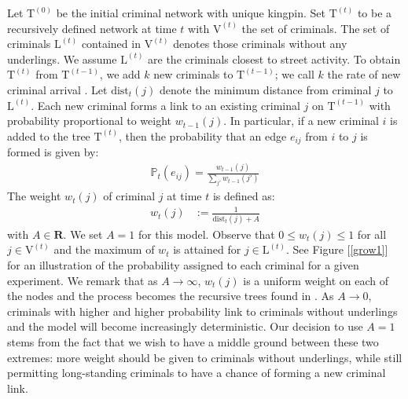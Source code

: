 \documentclass[%
 reprint,
 amsmath,amssymb,
 aps,
]{revtex4-1}
\newcommand{\dist}{\textrm{dist}}
\renewcommand{\b}[1]{\mathbf{#1}}
\renewcommand{\t }[1]{\mathrm{#1}}
\newcommand{\bb}[1]{\mathbb{#1}}
\renewcommand{\L}{\mathrm{L}}
\newcommand{\V}{\mathrm{V}}
\theoremstyle{plain}
\theoremstyle{definition}
\begin{document}
Let $\t T^{(0)}$ be the initial criminal network with unique kingpin.  Set $\t T^{(t)}$ to be a recursively defined network at time $t$ with $\V^{(t)}$ the set of criminals.  The set of criminals $\L^{(t)}$ contained in $\V^{(t)}$ denotes those criminals without any underlings.  We assume $\L^{(t)}$ are the criminals closest to street activity.  To obtain $\t T^{(t)}$ from $\t T^{(t-1)}$, we add $k$ new criminals to $\t T^{(t-1)}$; we call $k$ the rate of new criminal arrival . Let $\dist_t(j)$ denote the minimum distance from criminal $j$ to $\L^{(t)}$.  Each new criminal forms a link to an existing criminal $j$ on $\t T^{(t-1)}$ with probability proportional to weight $w_{t-1}(j)$.   In particular, if a new criminal $i$ is added to the tree $\t T^{(t)}$, then the probability that an edge $e_{ij}$ from $i$ to $j$ is formed is given by:
\begin{align}
\bb{P}_t(e_{ij}) = \frac{w_{t-1}(j)}{\sum_{j'} w_{t-1}(j')}
\end{align}
The weight $w_t(j)$ of criminal $j$ at time $t$ is defined as:
\begin{align}
w_t(j)  &:= \frac{1}{\dist_t(j)+A}
\end{align}
with $A\in \b R$.  We set $A = 1$ for this model.  Observe that $0 \leq w_t(j) \leq 1$ for all $j \in \V^{(t)}$ and the maximum of $w_t$ is attained for $j \in \L^{(t)}$.  See Figure [\ref{grow1}] for an illustration of the probability assigned to each criminal for a given experiment.  We remark that as $A \to \infty$, $w_t(j)$ is a uniform weight on each of the nodes and the process becomes the recursive trees found in \cite{Mahmoud1, Mahmoud2, sz}.  As $A \to 0$, criminals with higher and higher probability link to criminals without underlings and the model will become increasingly deterministic.  Our decision to use $A  = 1$ stems from the fact that we wish to have a middle ground between these two extremes: more weight should be given to criminals without underlings, while still permitting long-standing criminals to have a chance of forming a new criminal link.
\end{document}
